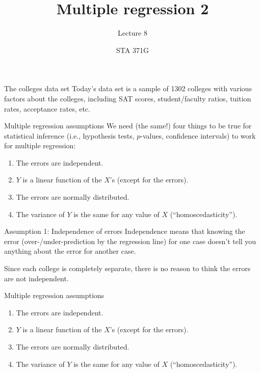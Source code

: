 \documentclass{beamer}\usepackage[]{graphicx}\usepackage[]{color}
\title{Multiple regression 2}
\subtitle{Lecture 8}
\author{STA 371G}
\begin{document}
  
  

  \frame{\maketitle}



  \begin{darkframes}
    \begin{frame}{The colleges data set}
      Today's data set is a sample of 1302 colleges with various factors about the colleges, including SAT scores, student/faculty ratios, tuition rates, acceptance rates, etc.
    \end{frame}

    \begin{frame}{Multiple regression assumptions}
      We need (the same!) four things to be true for statistical inference (i.e., hypothesis tests, $p$-values, confidence intervals) to work for multiple regression:
      \pause
      \begin{enumerate}
        \item The errors are independent.
        \item $Y$ is a linear function of the $X$'s (except for the errors).
        \item The errors are normally distributed.
        \item The variance of $Y$ is the same for any value of $X$ (``homoscedasticity'').
      \end{enumerate}
    \end{frame}

    \begin{frame}{Assumption 1: Independence of errors}
      Independence means that knowing the error (over-/under-prediction by the regression line) for one case doesn't tell you anything about the error for another case.

      \bigskip\pause

      Since each college is completely separate, there is no reason to think the errors are not independent.
    \end{frame}

    \begin{frame}{Multiple regression assumptions}
      \begin{enumerate}
        \item The errors are independent. \greencheckmark
        \item $Y$ is a linear function of the $X$'s (except for the errors).
        \item The errors are normally distributed.
        \item The variance of $Y$ is the same for any value of $X$ (``homoscedasticity'').
      \end{enumerate}
    \end{frame}


\end{darkframes}
\end{document}
